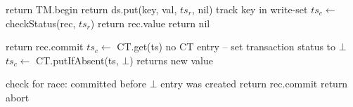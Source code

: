 \begin{algorithm}[t]
  \begin{algorithmic}
       \State  return TM.begin
\EndProcedure
%
       \State  return ds.put(key, val, $ts_r$, nil)
       \State  track key in write-set 
\EndProcedure
%     
 			\State $ts_c \leftarrow$ {\sc checkStatus}(rec, $ts_r$)
 			 	\State return  rec.value 
			\EndIf
      \EndFor
      \State  return nil
      \EndProcedure

\Statex


     			 \State return rec.commit \EndIf
      				\State $ts_c  \leftarrow$ CT.get(ts) 
      				  \Comment no CT entry -- set transaction status to $\bot$
      					\State $ts_c \leftarrow$ CT.putIfAbsent(ts, $\bot$) 
      					 \Comment returns new value
				\EndIf
      				
 				 	\State \Comment check for race: committed before $\bot$ entry was created
 				 	  return rec.commit \EndIf
 				 	\State return abort 				
				\EndIf

%
	   	\EndProcedure
\Statex


\end{algorithmic}
\end{algorithm}
